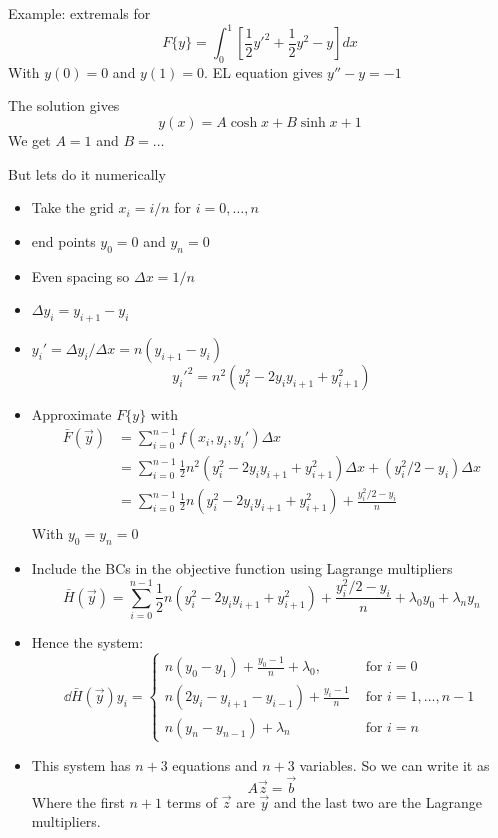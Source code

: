 \documentclass{E:/Documents/Latex/myassignment}
\begin{document}
Example: extremals for
\[F\{y\} = \int_0^1 \left[\frac12 y'^2 + \frac12 y^2 - y\right] dx\]
With $y(0) = 0$ and $y(1) = 0$.
EL equation gives $y'' - y =-1$

The solution gives
\[y(x) = A\cosh x + B \sinh x +1\]
We get $A = 1$ and $B = \ldots$

But lets do it numerically

\begin{itemize}
	\item Take the grid $x_i = i/n$ for $i=0,\ldots,n$
	\item end points $y_0 = 0$ and $y_n =0$
	\item Even spacing so $\Delta x = 1/n$
	\item $\Delta y_i = y_{i+1} - y_i$
	\item $y_i' = \Delta y_i / \Delta x = n(y_{i+1} - y_i)$
	\[y_i'^2 = n^2 (y_i^2 - 2y_i y_{i+1} + y_{i+1}^2)\]
	\item Approximate $F\{y\}$ with
	\begin{align*}
		\bar{F}(\vec y) &= \sum_{i=0}^{n-1} f(x_i,y_i,y_i') \Delta x\\
		&= \sum_{i=0}^{n-1} \frac12 n^2 (y_i^2 - 2y_i y_{i+1} + y_{i+1}^2) \Delta x + (y_i^2/2 - y_i) \Delta x\\
		&= \sum_{i=0}^{n-1} \frac12 n (y_i^2 - 2y_i y_{i+1} + y_{i+1}^2)  + \frac{y_i^2/2 - y_i}{n} \\
	\end{align*}
	With $y_0 = y_n =0$
	\item Include the BCs in the objective function using Lagrange multipliers
	\[\bar{H}(\vec y) = \sum_{i=0}^{n-1} \frac12 n (y_i^2 - 2y_i y_{i+1} + y_{i+1}^2)  + \frac{y_i^2/2 - y_i}{n}  + \lambda_0 y_0 + \lambda_n y_n\]

	\item Hence the system:
	\[\dd{\bar{H}(\vec y)}{y_i} = \begin{cases}
		n(y_0-y_1) + \frac{y_0-1}{n} + \lambda_0, &\text{ for }i=0\\
		n (2y_i - y_{i+1} - y_{i-1})  + \frac{y_i - 1}{n} &\text{ for }i=1,\ldots,n-1\\
		n(y_n-y_{n-1}) +\lambda_n &\text{ for } i=n
	\end{cases}\]
	\item This system has $n+3$ equations and $n+3$ variables.
	So we can write it as
	\[A\vec z = \vec b\]
	Where the first $n+1$ terms of $\vec z$ are $\vec y$ and the last two are the Lagrange multipliers.
\end{itemize}
\end{document}
